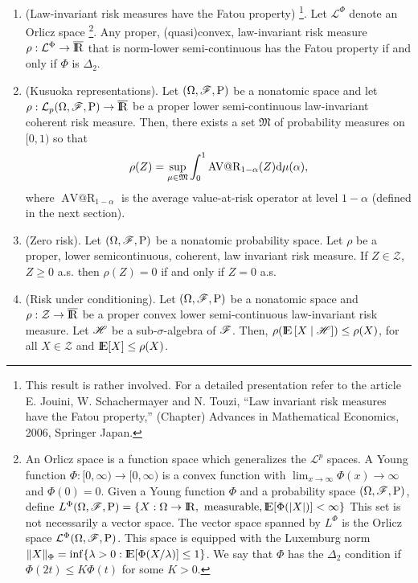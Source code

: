 \documentclass[a4paper,10pt]{article}
\newcommand{\ce}[1]{\E\left[#1 {}\mid{} \HH \right]}
\begin{document}
\begin{enumerate}
 \item (Law-invariant risk measures have the Fatou property)%
	  \footnote{This result is rather involved. For a detailed
	  presentation refer to the article E. Jouini, W. Schachermayer and N. Touzi, 
	  ``Law invariant risk measures have 
	  the Fatou property,'' (Chapter) Advances in Mathematical Economics, 2006, Springer Japan.}.
       Let $\mathcal{L}^\Phi$ denote an Orlicz space%
	  \footnote{An Orlicz space is a function space which generalizes 
	            the $\mathcal{L}^p$ spaces. A Young function $\Phi:[0,\infty)\to[0,\infty)$ is a convex function 
	            with $\lim_{x\to\infty} \Phi(x)\to\infty$ and $\Phi(0)= 0$.
	            Given a Young function $\Phi$ and a probability space $(\Omega,\mathscr{F},\mathrm{P})$, define 
	            $L^\Phi\ofp= \{X:\Omega\to\Re, \text{ measurable}, \E[\Phi(|X|)] < \infty\}$
	            This set is not necessarily a vector space. The vector space spanned by $L^\Phi$
	            is the Orlicz space $\mathcal{L}^\Phi(\Omega,\mathscr{F},\mathrm{P})$. This space is equipped with the Luxemburg 
	            norm $\|X\|_\Phi = \inf\{\lambda>0:\E[\Phi(X/\lambda)]\leq 1\}$. We say that $\Phi$
	            has the $\Delta_2$ condition if $\Phi(2t) \leq K \Phi(t)$ for some $K>0$.}. 
       Any proper, (quasi)convex, law-invariant risk measure $\rho:\mathcal{L}^\Phi\to\barre$
       that is norm-lower semi-continuous has the Fatou property if and only if $\Phi$ is $\Delta_2$.
 
 \item (Kusuoka representations). Let $(\Omega,\mathscr{F},\mathrm{P})$ be a nonatomic space and let $\rho:\mathcal{L}_p\ofp\to\barre$ be a proper
       lower semi-continuous law-invariant coherent risk measure. Then, there exists a set $\mathfrak{M}$ of probability measures 
       on $[0,1)$ so that 
       \[
        \rho(Z) = \sup_{\mu\in\mathfrak{M}}\int_{0}^{1}\operatorname{AV@R}_{1-\alpha}(Z)\mathrm{d}\mu(\alpha),
       \]
       where $\operatorname{AV@R}_{1-\alpha}$ is the average value-at-risk operator at level $1-\alpha$ (defined 
       in the next section).

 \item (Zero risk). Let $(\Omega,\mathscr{F},\mathrm{P})$ be a nonatomic probability space. Let $\rho$ be a proper, lower semicontinuous,
       coherent, law invariant risk measure. If $Z\in\mathcal{Z}$, $Z\geq 0$ a.s. then $\rho(Z)=0$ if and only if $Z=0$ a.s.
 \item (Risk under conditioning). Let $(\Omega,\mathscr{F},\mathrm{P})$ be a nonatomic space and $\rho:\mathcal{Z}\to\barre$ be a 
        proper convex lower semi-continuous  law-invariant risk measure. Let $\mathscr{H}$ be a sub-$\sigma$-algebra 
        of $\mathscr{F}$. Then, $\rho(\ce{X})\leq \rho(X)$, for all $X\in\mathcal{Z}$ and $\E[X]\leq \rho(X)$.
\end{enumerate}
\end{document}

